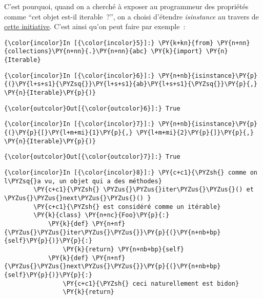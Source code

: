 C'est pourquoi, quand on a cherché à exposer au programmeur des
propriétés comme ``cet objet est-il iterable~?'', on a choisi d'étendre
\emph{isinstance} au travers de
\href{http://legacy.python.org/dev/peps/pep-3119/}{cette initiative}.
C'est ainsi qu'on peut faire par exemple~:

    \begin{Verbatim}[commandchars=\\\{\},frame=single,framerule=0.3mm,rulecolor=\color{cellframecolor}]
{\color{incolor}In [{\color{incolor}5}]:} \PY{k+kn}{from} \PY{n+nn}{collections}\PY{n+nn}{.}\PY{n+nn}{abc} \PY{k}{import} \PY{n}{Iterable}
\end{Verbatim}


    \begin{Verbatim}[commandchars=\\\{\},frame=single,framerule=0.3mm,rulecolor=\color{cellframecolor}]
{\color{incolor}In [{\color{incolor}6}]:} \PY{n+nb}{isinstance}\PY{p}{(}\PY{l+s+s1}{\PYZsq{}}\PY{l+s+s1}{ab}\PY{l+s+s1}{\PYZsq{}}\PY{p}{,} \PY{n}{Iterable}\PY{p}{)}
\end{Verbatim}


\begin{Verbatim}[commandchars=\\\{\},frame=single,framerule=0.3mm,rulecolor=\color{cellframecolor}]
{\color{outcolor}Out[{\color{outcolor}6}]:} True
\end{Verbatim}
            
    \begin{Verbatim}[commandchars=\\\{\},frame=single,framerule=0.3mm,rulecolor=\color{cellframecolor}]
{\color{incolor}In [{\color{incolor}7}]:} \PY{n+nb}{isinstance}\PY{p}{(}\PY{p}{[}\PY{l+m+mi}{1}\PY{p}{,} \PY{l+m+mi}{2}\PY{p}{]}\PY{p}{,} \PY{n}{Iterable}\PY{p}{)}
\end{Verbatim}


\begin{Verbatim}[commandchars=\\\{\},frame=single,framerule=0.3mm,rulecolor=\color{cellframecolor}]
{\color{outcolor}Out[{\color{outcolor}7}]:} True
\end{Verbatim}
            
    \begin{Verbatim}[commandchars=\\\{\},frame=single,framerule=0.3mm,rulecolor=\color{cellframecolor}]
{\color{incolor}In [{\color{incolor}8}]:} \PY{c+c1}{\PYZsh{} comme on l\PYZsq{}a vu, un objet qui a des méthodes}
        \PY{c+c1}{\PYZsh{} \PYZus{}\PYZus{}iter\PYZus{}\PYZus{}() et \PYZus{}\PYZus{}next\PYZus{}\PYZus{}() }
        \PY{c+c1}{\PYZsh{} est considéré comme un itérable}
        \PY{k}{class} \PY{n+nc}{Foo}\PY{p}{:}
            \PY{k}{def} \PY{n+nf}{\PYZus{}\PYZus{}iter\PYZus{}\PYZus{}}\PY{p}{(}\PY{n+nb+bp}{self}\PY{p}{)}\PY{p}{:}
                \PY{k}{return} \PY{n+nb+bp}{self}
            \PY{k}{def} \PY{n+nf}{\PYZus{}\PYZus{}next\PYZus{}\PYZus{}}\PY{p}{(}\PY{n+nb+bp}{self}\PY{p}{)}\PY{p}{:}
                \PY{c+c1}{\PYZsh{} ceci naturellement est bidon}
                \PY{k}{return}
\end{Verbatim}


